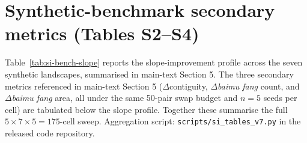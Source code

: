 \documentclass[11pt]{article}
\begin{document}
\section{Synthetic-benchmark secondary metrics (Tables S2--S4)}\label{si:s3-bench-secondary}

Table~\ref{tab:si-bench-slope} reports the slope-improvement profile across the seven synthetic landscapes, summarised in main-text Section 5. The three secondary metrics referenced in main-text Section 5 ($\Delta$contiguity, $\Delta$\textit{baimu fang} count, and $\Delta$\textit{baimu fang} area, all under the same 50-pair swap budget and $n{=}5$ seeds per cell) are tabulated below the slope profile. Together these summarise the full $5 \times 7 \times 5 = 175$-cell sweep. Aggregation script: \texttt{scripts/si\_tables\_v7.py} in the released code repository.
\end{document}
